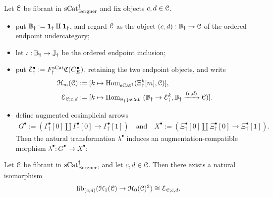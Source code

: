 \documentclass[a4paper,dvipdfmx,11pt]{amsart}
\begin{document}
\begin{notation}\label{jt.not.relative-endpoint-data}
  Let $\mathcal{C}$ be fibrant in $\mathrm{sCat}^{\dag}_{\mathrm{Bergner}}$ and fix objects $c,d\in\mathcal{C}$.
  \begin{itemize}
    \item put $\mathbb{B}_{\dag}:=\mathbf{1}_{\dag}\amalg\mathbf{1}_{\dag}$, and regard $\mathcal{C}$ as the object $(c,d):\mathbb{B}_{\dag}\to\mathcal{C}$ of the ordered endpoint undercategory;
    \item let $\iota:\mathbb{B}_{\dag}\to\mathbb{J}_{\dag}$ be the ordered endpoint inclusion;
    \item put $\mathcal{E}^{\bullet}_{\dag}:=F_{\dag}^{\mathrm{sCat}}\mathfrak{C}(C_E^{\bullet})$, retaining the two endpoint objects, and write
    \begin{align}
      \mathcal{H}_m(\mathcal{C})
      &:=[k\mapsto \operatorname{Hom}_{\mathrm{sCat}^{\dag}} (\Xi^k_{\dag}[m],\mathcal{C})],
      \\
      \mathcal{E}_{\mathcal{C};c,d}
      &:=[k\mapsto \operatorname{Hom}_{\mathbb{B}_{\dag}\mathbin{\downarrow}\mathrm{sCat}^{\dag}}(\mathbb{B}_{\dag}\to\mathcal{E}^k_{\dag},\mathbb{B}_{\dag}\xrightarrow{(c,d)}\mathcal{C})].
    \end{align}
    \item define augmented cosimplicial arrows
    \begin{align}
      G^{\bullet}
      :=(\Gamma^{\bullet}_{\dag}[0]\amalg\Gamma^{\bullet}_{\dag}[0]
        \to\Gamma^{\bullet}_{\dag}[1])
      \quad \text{and} \quad 
      X^{\bullet}
      :=(\Xi^{\bullet}_{\dag}[0]\amalg\Xi^{\bullet}_{\dag}[0]
        \to\Xi^{\bullet}_{\dag}[1]).
    \end{align}
    Then the natural transformation $\lambda^{\bullet}$ induces an augmentation-compatible morphism $\lambda^{\bullet}:G^{\bullet}\to X^{\bullet}$;
  \end{itemize}
\end{notation}

\begin{lemma}\label{jt.lem.relative-endpoint-frame}
  Let $\mathcal{C}$ be fibrant in $\mathrm{sCat}^{\dag}_{\mathrm{Bergner}}$, and let $c,d\in\mathcal{C}$.
  Then there exists a natural isomorphism
  \begin{align}
    \mathrm{fib}_{(c,d)}(\mathcal{H}_1(\mathcal{C})\to\mathcal{H}_0(\mathcal{C})^2)
    \cong
    \mathcal{E}_{\mathcal{C};c,d}.
  \end{align}
\end{lemma}
\end{document}
